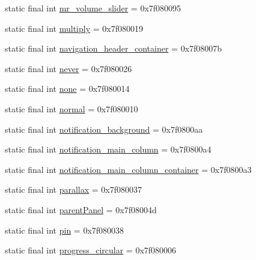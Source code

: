 \begin{CompactItemize}
\item 
static final int \hyperlink{classandroid_1_1support_1_1v7_1_1recyclerview_1_1_r_1_1id_a928ffc632745d4dc184f2b583f4bc2f}{mr\_\-volume\_\-slider} = 0x7f080095
\item 
static final int \hyperlink{classandroid_1_1support_1_1v7_1_1recyclerview_1_1_r_1_1id_fd873e2ea0016e44a83357e89123776a}{multiply} = 0x7f080019
\item 
static final int \hyperlink{classandroid_1_1support_1_1v7_1_1recyclerview_1_1_r_1_1id_bf65b002203cfede3b5777ac9f5f61aa}{navigation\_\-header\_\-container} = 0x7f08007b
\item 
static final int \hyperlink{classandroid_1_1support_1_1v7_1_1recyclerview_1_1_r_1_1id_17d8348c5aac534ccd1b5f615f5971f5}{never} = 0x7f080026
\item 
static final int \hyperlink{classandroid_1_1support_1_1v7_1_1recyclerview_1_1_r_1_1id_f49f8ab52e2e627f6511f8147dc06f49}{none} = 0x7f080014
\item 
static final int \hyperlink{classandroid_1_1support_1_1v7_1_1recyclerview_1_1_r_1_1id_99ca1dc6681563b113ecd09f92326fc0}{normal} = 0x7f080010
\item 
static final int \hyperlink{classandroid_1_1support_1_1v7_1_1recyclerview_1_1_r_1_1id_88a45af5b52f860fa0f5580978a7a5c0}{notification\_\-background} = 0x7f0800aa
\item 
static final int \hyperlink{classandroid_1_1support_1_1v7_1_1recyclerview_1_1_r_1_1id_ede4df7320ba263268681be5d23f2577}{notification\_\-main\_\-column} = 0x7f0800a4
\item 
static final int \hyperlink{classandroid_1_1support_1_1v7_1_1recyclerview_1_1_r_1_1id_596b7c4f20a51f55b09d5c1641ae2281}{notification\_\-main\_\-column\_\-container} = 0x7f0800a3
\item 
static final int \hyperlink{classandroid_1_1support_1_1v7_1_1recyclerview_1_1_r_1_1id_8aff2a7e9781e0da75c4748c258cb9b3}{parallax} = 0x7f080037
\item 
static final int \hyperlink{classandroid_1_1support_1_1v7_1_1recyclerview_1_1_r_1_1id_ab61a9b313fe9fce0408f85f691b16a8}{parentPanel} = 0x7f08004d
\item 
static final int \hyperlink{classandroid_1_1support_1_1v7_1_1recyclerview_1_1_r_1_1id_b3ce5fcfeabe0fcdb02a155449483857}{pin} = 0x7f080038
\item 
static final int \hyperlink{classandroid_1_1support_1_1v7_1_1recyclerview_1_1_r_1_1id_b259f1342abae2a305a56ad336c9e67d}{progress\_\-circular} = 0x7f080006
\item 

\end{CompactItemize}
